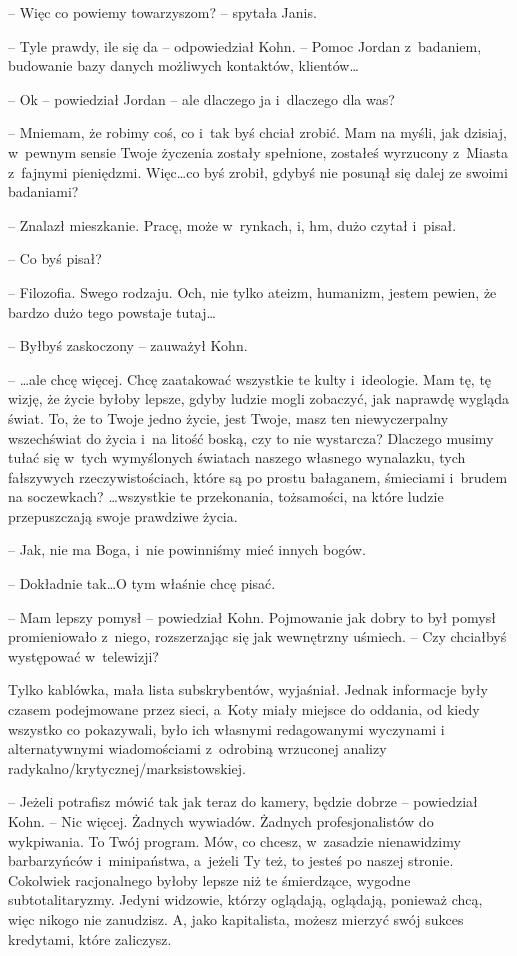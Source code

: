 \documentclass[oneside,polish,11pt,sfheadings]{mwbk}
\begin{document}
-- Więc co powiemy towarzyszom? -- spytała Janis.

-- Tyle prawdy, ile się da -- odpowiedział Kohn. -- Pomoc Jordan z~badaniem, budowanie bazy danych możliwych kontaktów, klientów\ldots

-- Ok -- powiedział Jordan -- ale dlaczego ja i~dlaczego dla was?

-- Mniemam, że robimy coś, co i~tak byś chciał zrobić. Mam na myśli, jak
dzisiaj, w~pewnym sensie Twoje życzenia zostały spełnione, zostałeś
wyrzucony z~Miasta z~fajnymi pieniędzmi. Więc\ldots co byś zrobił, gdybyś
nie posunął się dalej ze swoimi badaniami?

-- Znalazł mieszkanie. Pracę, może w~rynkach, i, hm, dużo czytał i~pisał.

-- Co byś pisał?

-- Filozofia. Swego rodzaju. Och, nie tylko ateizm, humanizm, jestem
pewien, że bardzo dużo tego powstaje tutaj\ldots

-- Byłbyś zaskoczony -- zauważył Kohn.

-- \ldots ale chcę więcej. Chcę zaatakować wszystkie te kulty i~ideologie.
Mam tę, tę wizję, że życie byłoby lepsze, gdyby ludzie mogli zobaczyć,
jak naprawdę wygląda świat. To, że to Twoje jedno życie, jest Twoje,
masz ten niewyczerpalny wszechświat do życia i~na litość boską, czy to
nie wystarcza? Dlaczego musimy tułać się w~tych wymyślonych światach
naszego własnego wynalazku, tych fałszywych rzeczywistościach, które są
po prostu bałaganem, śmieciami i~brudem na soczewkach? \ldots wszystkie te
przekonania, tożsamości, na które ludzie przepuszczają swoje prawdziwe
życia.

-- Jak, nie ma Boga, i~nie powinniśmy mieć innych bogów.

-- Dokładnie tak\ldots O tym właśnie chcę pisać.

-- Mam lepszy pomysł -- powiedział Kohn. Pojmowanie jak dobry to był
pomysł promieniowało z~niego, rozszerzając się jak wewnętrzny uśmiech. -- Czy chciałbyś występować w~telewizji?

Tylko kablówka, mała lista subskrybentów, wyjaśniał. Jednak informacje
były czasem podejmowane przez sieci, a~Koty miały miejsce do oddania, od
kiedy wszyst\-ko co pokazywali, było ich własnymi redagowanymi wyczynami
i alternatywnymi wiadomościami z~odrobiną wrzuconej analizy
radykalno/krytycznej/marksistowskiej.

-- Jeżeli potrafisz mówić tak jak teraz do kamery, będzie dobrze -- powiedział Kohn. -- Nic więcej. Żadnych wywiadów. Żadnych
profesjonalistów do wykpiwania. To Twój program. Mów, co chcesz, w~zasadzie nienawidzimy barbarzyńców i~minipaństwa, a~jeżeli Ty też, to
jesteś po naszej stronie. Cokolwiek racjonalnego byłoby lepsze niż te
śmierdzące, wygodne subtotalitaryzmy. Jedyni widzowie, którzy oglądają,
oglądają, ponieważ chcą, więc nikogo nie zanudzisz. A, jako kapitalista,
możesz mierzyć swój sukces kredytami, które zaliczysz.
\end{document}
